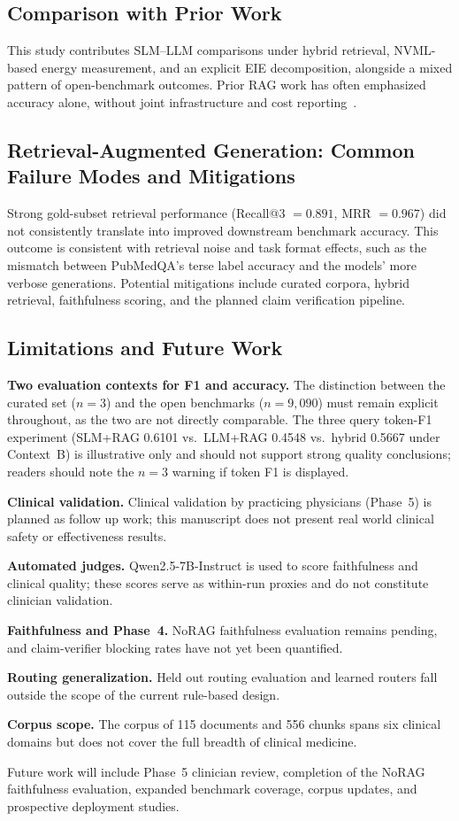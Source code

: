 \subsection{Comparison with Prior Work}

This study contributes SLM--LLM comparisons under hybrid retrieval, NVML-based energy measurement, and an explicit EIE decomposition, alongside a mixed pattern of open-benchmark outcomes. Prior RAG work has often emphasized accuracy alone, without joint infrastructure and cost reporting~\cite{yang2025rag,ren2024reconciling}.

\subsection{Retrieval-Augmented Generation: Common Failure Modes and Mitigations}

Strong gold-subset retrieval performance (Recall@3 $=0.891$, MRR $=0.967$) did not consistently translate into improved downstream benchmark accuracy. This outcome is consistent with retrieval noise and task format effects, such as the mismatch between PubMedQA's terse label accuracy and the models' more verbose generations. Potential mitigations include curated corpora, hybrid retrieval, faithfulness scoring, and the planned claim verification pipeline.

\subsection{Limitations and Future Work}

\textbf{Two evaluation contexts for F1 and accuracy.} The distinction between the curated set ($n{=}3$) and the open benchmarks ($n{=}9{,}090$) must remain explicit throughout, as the two are not directly comparable. The three query token-F1 experiment (SLM+RAG 0.6101 vs.\ LLM+RAG 0.4548 vs.\ hybrid 0.5667 under Context~B) is illustrative only and should not support strong quality conclusions; readers should note the $n{=}3$ warning if token F1 is displayed.

\textbf{Clinical validation.} Clinical validation by practicing physicians (Phase~5) is planned as follow up work; this manuscript does not present real world clinical safety or effectiveness results.

\textbf{Automated judges.} Qwen2.5-7B-Instruct is used to score faithfulness and clinical quality; these scores serve as within-run proxies and do not constitute clinician validation.

\textbf{Faithfulness and Phase~4.} NoRAG faithfulness evaluation remains pending, and claim-verifier blocking rates have not yet been quantified.

\textbf{Routing generalization.} Held out routing evaluation and learned routers fall outside the scope of the current rule-based design.

\textbf{Corpus scope.} The corpus of 115 documents and 556 chunks spans six clinical domains but does not cover the full breadth of clinical medicine.

Future work will include Phase~5 clinician review, completion of the NoRAG faithfulness evaluation, expanded benchmark coverage, corpus updates, and prospective deployment studies.